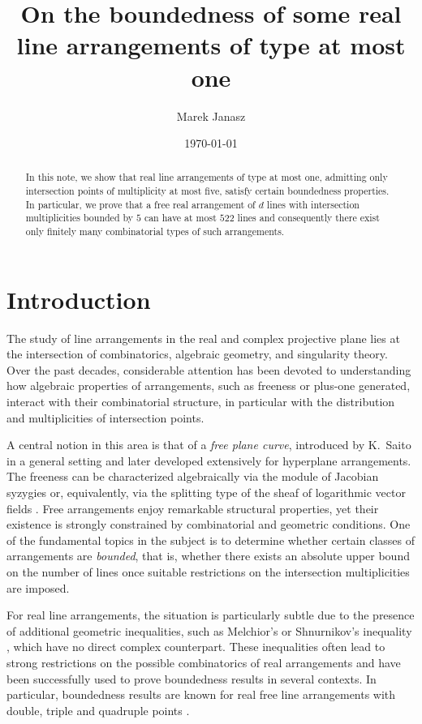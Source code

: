 \documentclass[11pt]{article}
\title{\textbf{On the boundedness of some real line arrangements of type at most one}}
\author{Marek Janasz}
\date{\today}
\theoremstyle{plain}
\theoremstyle{definition}
\theoremstyle{remark}
\begin{document}
\maketitle

\begin{abstract}
In this note, we show that real line arrangements of type at most one, admitting only intersection points of multiplicity at most five, satisfy certain boundedness properties. In particular, we prove that a free real arrangement of \(d\) lines with intersection multiplicities bounded by \(5\) can have at most \(522\) lines and consequently there exist only finitely many combinatorial types of such arrangements.
\end{abstract}
\section{Introduction}\label{s:introduction}
The study of line arrangements in the real and complex projective plane lies at the intersection
of combinatorics, algebraic geometry, and singularity theory. Over the past decades, considerable
attention has been devoted to understanding how algebraic properties of arrangements, such as
freeness or plus-one generated, interact with their combinatorial structure, in particular with the
distribution and multiplicities of intersection points.

A central notion in this area is that of a \emph{free plane curve}, introduced by K.~Saito \cite{Saito} in a general setting and
later developed extensively for hyperplane arrangements. The freeness can be characterized algebraically via the module of Jacobian syzygies or, equivalently,
via the splitting type of the sheaf of logarithmic vector fields \cite{Dimca}. Free arrangements enjoy
remarkable structural properties, yet their existence is strongly constrained by combinatorial and geometric conditions. One of the fundamental topics in the subject is to determine whether certain classes of arrangements are \emph{bounded}, that is, whether there exists an absolute
upper bound on the number of lines once suitable restrictions on the intersection multiplicities
are imposed.

For real line arrangements, the situation is particularly subtle due to the presence of
additional geometric inequalities, such as Melchior’s or Shnurnikov's inequality \cite{Melchior, Sh}, which have no direct complex
counterpart. These inequalities often lead to strong restrictions on the possible combinatorics
of real arrangements and have been successfully used to prove boundedness results in several
contexts. In particular, boundedness results are known for real free line arrangements with
double, triple and quadruple points \cite{JanLes05}.
\end{document}
